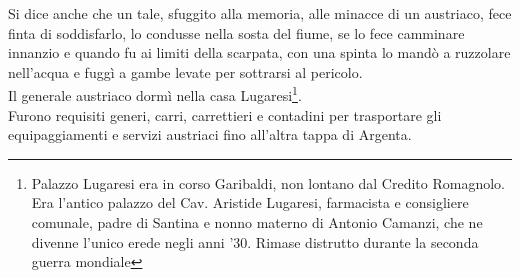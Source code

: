 Si dice anche che un tale, sfuggito alla memoria, alle minacce di un austriaco, fece finta di soddisfarlo, lo condusse nella sosta del fiume, se lo fece camminare innanzio e quando fu ai limiti della scarpata, con una spinta lo mandò a ruzzolare nell'acqua e fuggì a gambe levate per sottrarsi al pericolo.\\
Il generale austriaco dormì nella casa Lugaresi\footnote{Palazzo Lugaresi era in corso Garibaldi, non lontano dal Credito Romagnolo. Era l'antico palazzo del Cav. Aristide Lugaresi, farmacista e consigliere comunale, padre di Santina e nonno materno di Antonio Camanzi, che ne divenne l'unico erede negli anni '30. Rimase distrutto durante la seconda guerra mondiale}.\\
Furono requisiti generi, carri, carrettieri e contadini per trasportare gli equipaggiamenti e servizi austriaci fino all'altra tappa di Argenta.


